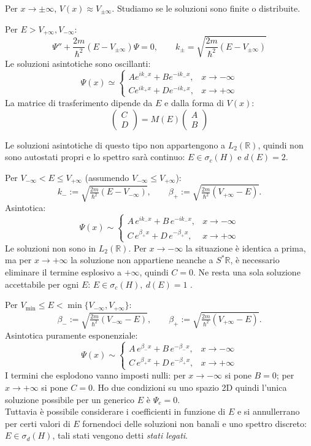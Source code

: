 Per \(x \to \pm\infty\), \(V(x) \approx V_{\pm\infty}\).  
Studiamo se le soluzioni sono finite o distribuite.

Per \(E > V_{+\infty}, V_{-\infty}\):
\[
\Psi'' + \frac{2m}{\hbar^2}(E - V_{\pm\infty})\Psi = 0, \qquad
k_\pm = \sqrt{\frac{2m}{\hbar^2}(E - V_{\pm\infty})}
\]
Le soluzioni asintotiche sono oscillanti:
\[
\Psi(x) \simeq 
\begin{cases}
A e^{i k_- x} + B e^{-i k_- x}, & x \to -\infty \\
C e^{i k_+ x} + D e^{-i k_+ x}, & x \to +\infty
\end{cases}
\]
La matrice di trasferimento dipende da \(E\) e dalla forma di \(V(x)\):
\[
\begin{pmatrix}
C \\ D
\end{pmatrix}
= M(E)
\begin{pmatrix}
A \\ B
\end{pmatrix}
\]

Le soluzioni asintotiche di questo tipo non appartengono a \(L_2(\mathbb{R})\), quindi non sono autostati propri e lo spettro
sarà continuo: \(E \in \sigma_c(H)\) e \(d(E)= 2\).

Per \(V_{-\infty} < E \le V_{+\infty}\) (assumendo \(V_{-\infty}\le V_{+\infty}\)):
\[
k_- := \sqrt{\tfrac{2m}{\hbar^2}(E - V_{-\infty})}, 
\qquad
\beta_+ := \sqrt{\tfrac{2m}{\hbar^2}(V_{+\infty} - E)}.
\]
Asintotica:
\[
\Psi(x)\sim 
\begin{cases}
A\,e^{ik_- x} + B\,e^{-ik_- x}, & x\to -\infty \\[4pt]
C\,e^{\beta_+ x} + D\,e^{-\beta_+ x}, & x\to +\infty
\end{cases}
\]
Le soluzioni non sono in \(L_2(\mathbb{R})\). Per \(x\to - \infty\) la situazione è identica a prima, ma per \(x\to + \infty\) la soluzione non appartiene neanche a \(S^*\mathbb{R}\),
è necessario eliminare il termine esplosivo a \(+\infty\), quindi \(C=0\). 
Ne resta una sola soluzione accettabile per ogni \(E\): \(E \in \sigma_c(H), \ d(E)=1 \) . 



\medskip
Per \(V_{\min} \le E < \min\{V_{-\infty},V_{+\infty}\}\):
\[
\beta_- := \sqrt{\tfrac{2m}{\hbar^2}(V_{-\infty}-E)}, \qquad
\beta_+ := \sqrt{\tfrac{2m}{\hbar^2}(V_{+\infty}-E)}.
\]
Asintotica puramente esponenziale:
\[
\Psi(x)\sim 
\begin{cases}
A\,e^{\beta_- x} + B\,e^{-\beta_- x}, & x\to -\infty \\[4pt]
C\,e^{\beta_+ x} + D\,e^{-\beta_+ x}, & x\to +\infty
\end{cases}
\]
I termini che esplodono vanno imposti nulli: per \(x\to -\infty\) si pone \(B=0\); per \(x\to +\infty\) si pone \(C=0\).
Ho due condizioni su uno spazio 2D quindi l'unica soluzione possibile per un generico \(E\) è \(\Psi_e=0\).\\
Tuttavia è possibile considerare i coefficienti in funzione di \(E\) e si annullerrano per certi valori di \(E\) fornendoci delle soluzioni non banali e uno spettro discreto:
\(E \in \sigma_d(H)\), tali stati vengono detti \textit{stati legati}.

